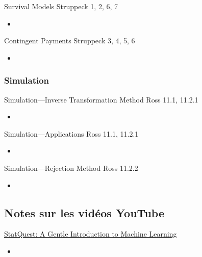 \documentclass[12pt, titlepage, french]{report}
\begin{document}
\begin{CHPT_SUMM_AUTO_NUMB}[label = {L.-20}]{Survival Models}
Struppeck 1, 2, 6, 7
	\begin{itemize}
		\item	
	\end{itemize}
\end{CHPT_SUMM_AUTO_NUMB}

\begin{CHPT_SUMM_AUTO_NUMB}[label = {L.-21}]{Contingent Payments}
Struppeck 3, 4, 5, 6
	\begin{itemize}
		\item	
	\end{itemize}
\end{CHPT_SUMM_AUTO_NUMB}

\subsubsection*{Simulation}

\begin{CHPT_SUMM_AUTO_NUMB}[label = {L.-22}]{Simulation---Inverse Transformation Method}
Ross 11.1, 11.2.1
	\begin{itemize}
		\item	
	\end{itemize}
\end{CHPT_SUMM_AUTO_NUMB}

\begin{CHPT_SUMM_AUTO_NUMB}[label = {L.-23}]{Simulation---Applications}
Ross 11.1, 11.2.1
	\begin{itemize}
		\item	
	\end{itemize}
\end{CHPT_SUMM_AUTO_NUMB}

\begin{CHPT_SUMM_AUTO_NUMB}[label = {L.-24}]{Simulation---Rejection Method}
Ross 11.2.2
	\begin{itemize}
		\item	
	\end{itemize}
\end{CHPT_SUMM_AUTO_NUMB}

\subsection{Notes sur les vidéos YouTube}

\begin{YTB_SUMM}[label = {SQ-BASICS-ML-INTRO}]{\href{https://www.youtube.com/watch?v=Gv9_4yMHFhI&list=PLblh5JKOoLUICTaGLRoHQDuF_7q2GfuJF&index=2&t=0s}{StatQuest: A Gentle Introduction to Machine Learning}}
\begin{itemize}
	\item	
\end{itemize}
\end{YTB_SUMM}
\end{document}
